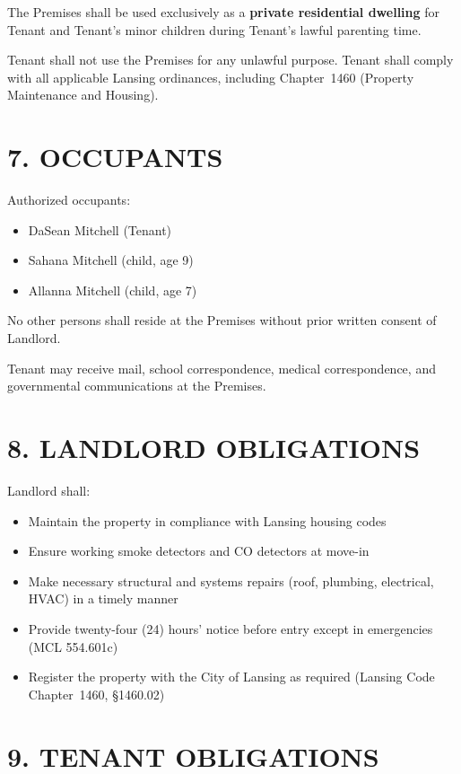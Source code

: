 \documentclass[11pt]{article}
\begin{document}
The Premises shall be used exclusively as a \textbf{private residential
dwelling} for Tenant and Tenant's minor children during Tenant's lawful
parenting time.

Tenant shall not use the Premises for any unlawful purpose. Tenant
shall comply with all applicable Lansing ordinances, including
Chapter~1460 (Property Maintenance and Housing).

\section{7. OCCUPANTS}

Authorized occupants:

\begin{itemize}[nosep]
\item DaSean Mitchell (Tenant)
\item Sahana Mitchell (child, age 9)
\item Allanna Mitchell (child, age 7)
\end{itemize}

No other persons shall reside at the Premises without prior written
consent of Landlord.

Tenant may receive mail, school correspondence, medical correspondence,
and governmental communications at the Premises.

\section{8. LANDLORD OBLIGATIONS}

Landlord shall:

\begin{itemize}[nosep]
\item Maintain the property in compliance with Lansing housing codes
\item Ensure working smoke detectors and CO detectors at move-in
\item Make necessary structural and systems repairs (roof, plumbing,
  electrical, HVAC) in a timely manner
\item Provide twenty-four (24) hours' notice before entry except in
  emergencies (MCL 554.601c)
\item Register the property with the City of Lansing as required
  (Lansing Code Chapter~1460, \S1460.02)
\end{itemize}

\section{9. TENANT OBLIGATIONS}
\end{document}
